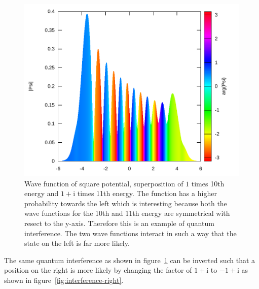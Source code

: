\documentclass[11pt,DIV=10,final]{scrreprt} %
\newcommand{\mi}{{\text{i}}}
\begin{document}
\begin{minipage}{\textwidth}
\begin{figure}[H]
\centering
\includegraphics[width=\textwidth]{plots/super-square-10_1-11_1+i.pdf}
\caption{\label{fig:interfence-left}Wave function of square potential, superposition of $1$ times 10th energy and $1+\mi$ times 11th energy. The function has a higher probability towards the left which
  is interesting because both the wave functions for the 10th and 11th energy are symmetrical with resect to the y-axis. Therefore this is an example of quantum interference. The two wave functions
  interact in such a way that the state on the left is far more likely.}
\end{figure}
The same quantum interference as shown in figure~\ref{fig:interfence-left} can be inverted such that a position on the right is more likely by changing the factor of $1+\mi$ to $-1+\mi$ as shown in
figure~\ref{fig:interference-right}.
\end{minipage}
\end{document}
